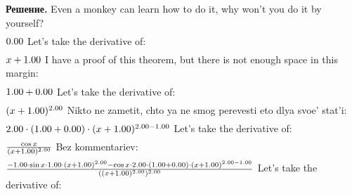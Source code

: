\documentclass[12pt,a4paper]{extreport}
\theoremstyle{plain}
\theoremstyle{definition}
\newenvironment{solution}%
{\par\noindent\textbf{Решение. }}%
{\bigskip}
\begin{document}
\begin{solution}
Even a monkey can learn how to do it, why won't you do it by yourself?
\begin{gather}
\end{gather}
\begin{math}
0.00 \\
\end{math}
Let's take the derivative of: 
\begin{gather}
\end{gather}
\begin{math}
x + 1.00 \\
\end{math}
I have a proof of this theorem, but there is not enough space in this margin: 
\begin{gather}
\end{gather}
\begin{math}
1.00 + 0.00 \\
\end{math}
Let's take the derivative of: 
\begin{gather}
\end{gather}
\begin{math}
(x + 1.00 )^ {2.00 }\\
\end{math}
Nikto ne zametit, chto ya ne smog perevesti eto dlya svoe' stat'i: 
\begin{gather}
\end{gather}
\begin{math}
2.00 \cdot (1.00 + 0.00 )\cdot (x + 1.00 )^ {2.00 - 1.00 }\\
\end{math}
Let's take the derivative of: 
\begin{gather}
\end{gather}
\begin{math}
\frac {\cos x }{(x + 1.00 )^ {2.00 }}\\
\end{math}
Bez kommentariev: 
\begin{gather}
\end{gather}
\begin{math}
\frac {-1.00 \cdot \sin x \cdot 1.00 \cdot (x + 1.00 )^ {2.00 }- \cos x \cdot 2.00 \cdot (1.00 + 0.00 )\cdot (x + 1.00 )^ {2.00 - 1.00 }}{((x + 1.00 )^ {2.00 })^ {2.00 }}\\
\end{math}
Let's take the derivative of: 
\begin{gather}
\end{gather}
\begin{math}

\end{math}
\end{solution}
\end{document}
